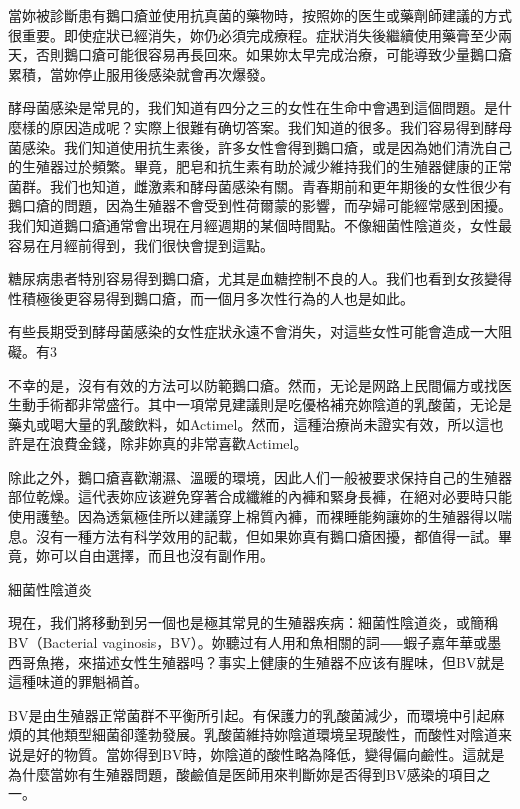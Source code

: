 \documentclass[12pt,UTF8]{ctexbook}
\begin{document}
當妳被診斷患有鵝口瘡並使用抗真菌的藥物時，按照妳的医生或藥劑師建議的方式很重要。即使症狀已經消失，妳仍必須完成療程。症狀消失後繼續使用藥膏至少兩天，否則鵝口瘡可能很容易再長回來。如果妳太早完成治療，可能導致少量鵝口瘡累積，當妳停止服用後感染就會再次爆發。

酵母菌感染是常見的，我们知道有四分之三的女性在生命中會遇到這個問題。是什麼樣的原因造成呢？实際上很難有确切答案。我们知道的很多。我们容易得到酵母菌感染。我们知道使用抗生素後，許多女性會得到鵝口瘡，或是因為她们清洗自己的生殖器过於頻繁。畢竟，肥皂和抗生素有助於減少維持我们的生殖器健康的正常菌群。我们也知道，雌激素和酵母菌感染有關。青春期前和更年期後的女性很少有鵝口瘡的問題，因為生殖器不會受到性荷爾蒙的影響，而孕婦可能經常感到困擾。我们知道鵝口瘡通常會出現在月經週期的某個時間點。不像細菌性陰道炎，女性最容易在月經前得到，我们很快會提到這點。

糖尿病患者特別容易得到鵝口瘡，尤其是血糖控制不良的人。我们也看到女孩變得性積極後更容易得到鵝口瘡，而一個月多次性行為的人也是如此。

有些長期受到酵母菌感染的女性症狀永遠不會消失，对這些女性可能會造成一大阻礙。有3%

不幸的是，沒有有效的方法可以防範鵝口瘡。然而，无论是网路上民間偏方或找医生動手術都非常盛行。其中一項常見建議則是吃優格補充妳陰道的乳酸菌，无论是藥丸或喝大量的乳酸飲料，如Actimel。然而，這種治療尚未證实有效，所以這也許是在浪費金錢，除非妳真的非常喜歡Actimel。

除此之外，鵝口瘡喜歡潮濕、溫暖的環境，因此人们一般被要求保持自己的生殖器部位乾燥。這代表妳应该避免穿著合成纖維的內褲和緊身長褲，在絕对必要時只能使用護墊。因為透氣極佳所以建議穿上棉質內褲，而裸睡能夠讓妳的生殖器得以喘息。沒有一種方法有科学效用的記載，但如果妳真有鵝口瘡困擾，都值得一試。畢竟，妳可以自由選擇，而且也沒有副作用。





細菌性陰道炎




現在，我们將移動到另一個也是極其常見的生殖器疾病：細菌性陰道炎，或簡稱BV（Bacterial vaginosis，BV）。妳聽过有人用和魚相關的詞⸺蝦子嘉年華或墨西哥魚捲，來描述女性生殖器吗？事实上健康的生殖器不应该有腥味，但BV就是這種味道的罪魁禍首。

BV是由生殖器正常菌群不平衡所引起。有保護力的乳酸菌減少，而環境中引起麻煩的其他類型細菌卻蓬勃發展。乳酸菌維持妳陰道環境呈現酸性，而酸性对陰道来说是好的物質。當妳得到BV時，妳陰道的酸性略為降低，變得偏向鹼性。這就是為什麼當妳有生殖器問題，酸鹼值是医師用來判斷妳是否得到BV感染的項目之一。
\end{document}
